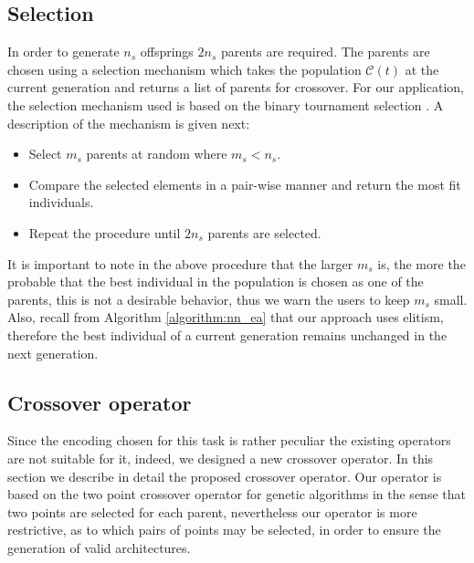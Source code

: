 \documentclass[journal]{IEEEtran}
\begin{document}
\subsection{Selection}
\label{sec:selection}

In order to generate $n_s$ offsprings $2n_s$ parents are required. The parents are chosen using a selection mechanism which takes the population $\mathcal{C}(t)$ at the current generation and returns a list of parents for crossover. For our application, the selection mechanism used is based on the binary tournament selection \cite{Engelbrecht2007, Krishnakumar1989}. A description of the mechanism is given next: 

\begin{itemize}
\item Select $m_s$ parents at random where $m_s < n_s$.
\item Compare the selected elements in a pair-wise manner and return the most fit individuals.
\item Repeat the procedure until $2n_s$ parents are selected.
\end{itemize}

It is important to note in the above procedure that the larger $m_s$ is, the more the probable that the best individual in the population is chosen as one of the parents, this is not a desirable behavior, thus we warn the users to keep $m_s$ small. Also, recall from Algorithm \ref{algorithm:nn_ea} that our approach uses elitism, therefore the best individual of a current generation remains unchanged in the next generation.

\subsection{Crossover operator}
\label{sec:crossover}

Since the encoding chosen for this task is rather peculiar the existing operators are not suitable for it, indeed, we designed a new crossover operator. In this section we describe in detail the proposed crossover operator. Our operator is based on the two point crossover operator for genetic algorithms \cite{holland1992} in the sense that two points are selected for each parent, nevertheless our operator is more restrictive, as to which pairs of points may be selected, in order to ensure the generation of valid architectures. 
\end{document}
